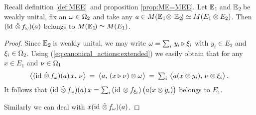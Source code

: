 \begin{prop_sec} \label{prop:slicing_multipliers}
{\rm Recall definition \ref{def:MEE}\ and proposition \ref{prop:ME=MEE}}\@.
Let\/ $\mathbb{E}_{\hspace{0.5pt}1}\!$ and\/ $\mathbb{E}_{\hspace{0.5pt}2}\!$ be weakly unital, fix an\/ $\omega \in \Omega_2$ and
take any\/ $a \in M(\mathbb{E}_{\hspace{0.5pt}1}\! \otimes\, \mathbb{E}_{\hspace{0.5pt}2}\!) \simeq  M(E_1 \otimes E_2)$.
Then\/ $(\mbox{\rm id}\, \,\hat{\otimes}\, f_\omega)(a)$ belongs to\/ $M(\mathbb{E}_{\hspace{0.5pt}1}\!) \simeq  M(E_1)$.
\end{prop_sec}
\begin{proof}
Since $\mathbb{E}_{\hspace{0.5pt}2}\!$ is weakly unital, we may write $\omega = \sum_i \, y_i \triangleright \xi_i$
with $y_i \in E_2$ and $\xi_i \in \Omega_2$.
Using (\ref{eq:canonical_actions:extended}) we easily obtain that
for any $x\in E_1$ and $\nu \in \Omega_1$
$$ \pairM{(\id\, \slice f_\om)(a)\,x}{\nu}
    \:=\: \pairM{a}{(x\lact \nu) \tens \om}
    \:=\: \textstyle \sum_i \, \pairM{a(x \tens y_i)}{\nu \tens \xi_i}. $$
It follows that
$(\id\, \slice f_\om)(a)\,x  =  \sum_i \, (\id\, \tens f_{\xi_i})
            \left(\vertM a(x \tens y_i) \right)$ belongs to $E_1$.

Similarly we can deal with $x(\mbox{\rm id}\, \,\hat{\otimes}\, f_\omega)(a)$.
\end{proof}
